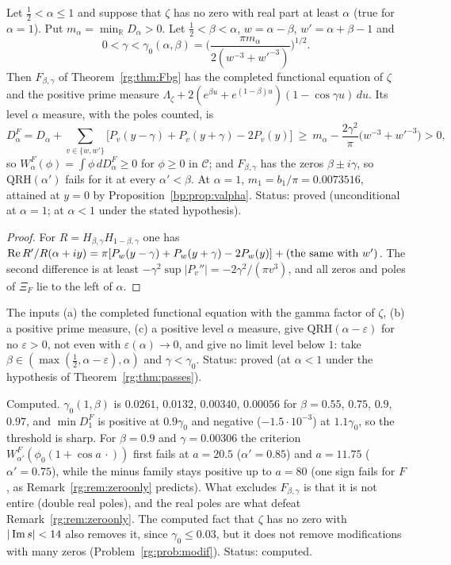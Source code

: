 \begin{theorem}\label{rg:thm:passes}
Let $\frac12<\alpha\le1$ and suppose that $\zeta$ has no zero with real part at least $\alpha$ (true for $\alpha=1$). Put $m_\alpha=\min_{\mathbb R}D_\alpha>0$. Let $\frac12<\beta<\alpha$, $w=\alpha-\beta$, $w'=\alpha+\beta-1$ and
\[0<\gamma<\gamma_0(\alpha,\beta)=\Big(\frac{\pi m_\alpha}{2(w^{-3}+w'^{-3})}\Big)^{1/2}.\]
Then $F_{\beta,\gamma}$ of Theorem~\ref{rg:thm:Fbg} has the completed functional equation of $\zeta$ and the positive prime measure $\Lambda_\zeta+2(e^{\beta u}+e^{(1-\beta)u})(1-\cos\gamma u)\,du$. Its level $\alpha$ measure, with the poles counted, is
\[D^F_\alpha=D_\alpha+\sum_{v\in\{w,w'\}}\big[P_v(y-\gamma)+P_v(y+\gamma)-2P_v(y)\big]\ \ge\ m_\alpha-\frac{2\gamma^2}\pi\big(w^{-3}+w'^{-3}\big)>0,\]
so $W^F_\alpha(\phi)=\int\phi\,dD^F_\alpha\ge0$ for $\phi\ge0$ in $\mathcal C$; and $F_{\beta,\gamma}$ has the zeros $\beta\pm i\gamma$, so $\mathrm{QRH}(\alpha')$ fails for it at every $\alpha'<\beta$. At $\alpha=1$, $m_1=b_1/\pi=0.0073516$, attained at $y=0$ by Proposition~\ref{bp:prop:valpha}. Status: proved (unconditional at $\alpha=1$; at $\alpha<1$ under the stated hypothesis).
\end{theorem}

\begin{proof}
For $R=H_{\beta,\gamma}H_{1-\beta,\gamma}$ one has $\operatorname{Re} R'/R(\alpha+iy)=\pi[P_w(y-\gamma)+P_w(y+\gamma)-2P_w(y)]+(\text{the same with }w')$. The second difference is at least $-\gamma^2\sup|P_v''|=-2\gamma^2/(\pi v^3)$, and all zeros and poles of $\Xi_F$ lie to the left of $\alpha$.
\end{proof}

\begin{corollary}\label{rg:cor:nolimit}
The inputs (a) the completed functional equation with the gamma factor of $\zeta$, (b) a positive prime measure, (c) a positive level $\alpha$ measure, give $\mathrm{QRH}(\alpha-\varepsilon)$ for no $\varepsilon>0$, not even with $\varepsilon(\alpha)\to0$, and give no limit level below $1$: take $\beta\in(\max(\frac12,\alpha-\varepsilon),\alpha)$ and $\gamma<\gamma_0$. Status: proved (at $\alpha<1$ under the hypothesis of Theorem~\ref{rg:thm:passes}).
\end{corollary}

Computed. $\gamma_0(1,\beta)$ is $0.0261$, $0.0132$, $0.00340$, $0.00056$ for $\beta=0.55$, $0.75$, $0.9$, $0.97$, and $\min D^F_1$ is positive at $0.9\gamma_0$ and negative ($-1.5\cdot10^{-3}$) at $1.1\gamma_0$, so the threshold is sharp. For $\beta=0.9$ and $\gamma=0.00306$ the criterion $W^F_{\alpha'}(\phi_0(1+\cos a\,\cdot))$ first fails at $a=20.5$ ($\alpha'=0.85$) and $a=11.75$ ($\alpha'=0.75$), while the minus family stays positive up to $a=80$ (one sign fails for $F$, as Remark~\ref{rg:rem:zeroonly} predicts). What excludes $F_{\beta,\gamma}$ is that it is not entire (double real poles), and the real poles are what defeat Remark~\ref{rg:rem:zeroonly}. The computed fact that $\zeta$ has no zero with $|\operatorname{Im} s|<14$ also removes it, since $\gamma_0\le0.03$, but it does not remove modifications with many zeros (Problem~\ref{rg:prob:modif}). Status: computed.

